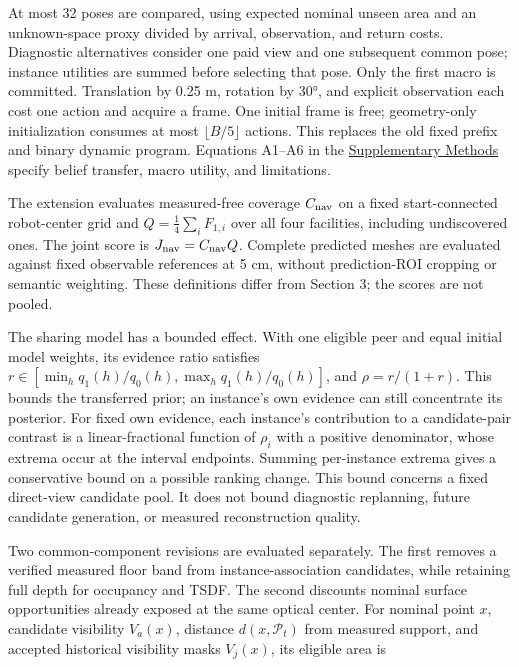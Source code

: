 \documentclass[11pt,a4paper]{article}
\begin{document}
At most 32 poses are compared, using expected nominal unseen area and an unknown-space proxy divided by arrival, observation, and return costs. Diagnostic alternatives consider one paid view and one subsequent common pose; instance utilities are summed before selecting that pose. Only the first macro is committed. Translation by 0.25 m, rotation by 30°, and explicit observation each cost one action and acquire a frame. One initial frame is free; geometry-only initialization consumes at most \(\lfloor B/5\rfloor\) actions. This replaces the old fixed prefix and binary dynamic program. Equations A1--A6 in the \href{/root/NSO/docs/thesis/ARTICLE_SUPPLEMENTARY_METHODS_20260928.pdf}{Supplementary Methods} specify belief transfer, macro utility, and limitations.

The extension evaluates measured-free coverage \(C_{\rm nav}\) on a fixed start-connected robot-center grid and \(Q=\tfrac14\sum_iF_{1,i}\) over all four facilities, including undiscovered ones. The joint score is \(J_{\rm nav}=C_{\rm nav}Q\). Complete predicted meshes are evaluated against fixed observable references at 5 cm, without prediction-ROI cropping or semantic weighting. These definitions differ from Section 3; the scores are not pooled.

The sharing model has a bounded effect. With one eligible peer and equal initial model weights, its evidence ratio satisfies \(r\in[\min_h q_1(h)/q_0(h),\max_h q_1(h)/q_0(h)]\), and \(\rho=r/(1+r)\). This bounds the transferred prior; an instance's own evidence can still concentrate its posterior. For fixed own evidence, each instance's contribution to a candidate-pair contrast is a linear-fractional function of \(\rho_i\) with a positive denominator, whose extrema occur at the interval endpoints. Summing per-instance extrema gives a conservative bound on a possible ranking change. This bound concerns a fixed direct-view candidate pool. It does not bound diagnostic replanning, future candidate generation, or measured reconstruction quality.

Two common-component revisions are evaluated separately. The first removes a verified measured floor band from instance-association candidates, while retaining full depth for occupancy and TSDF. The second discounts nominal surface opportunities already exposed at the same optical center. For nominal point \(x\), candidate visibility \(V_a(x)\), distance \(d(x,\mathcal P_t)\) from measured support, and accepted historical visibility masks \(V_j(x)\), its eligible area is
\end{document}
